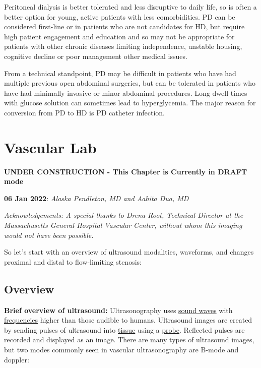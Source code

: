 \documentclass[
]{book}
\begin{document}
Peritoneal dialysis is better tolerated and less disruptive to daily
life, so is often a better option for young, active patients with less
comorbidities. PD can be considered first-line or in patients who are
not candidates for HD, but require high patient engagement and education
and so may not be appropriate for patients with other chronic diseases
limiting independence, unstable housing, cognitive decline or poor
management other medical issues.\citep{ansari2011}

From a technical standpoint, PD may be difficult in patients who have
had multiple previous open abdominal surgeries, but can be tolerated in
patients who have had minimally invasive or minor abdominal
procedures.\citep{sinnakirouchenan2011} Long dwell times with glucose
solution can sometimes lead to hyperglycemia. The major reason for
conversion from PD to HD is PD catheter infection.\citep{li2017}

\hypertarget{vascular-lab}{%
\chapter{Vascular Lab}\label{vascular-lab}}

\textbf{UNDER CONSTRUCTION - This Chapter is Currently in DRAFT mode}

\textbf{06 Jan 2022}: \emph{Alaska Pendleton, MD and Aahita Dua, MD}

\emph{Acknowledgements: A special thanks to Drena Root, Technical Director at
the Massachusetts General Hospital Vascular Center, without whom this
imaging would not have been possible.}

So let's start with an overview of ultrasound modalities, waveforms, and
changes proximal and distal to flow-limiting stenosis:

\hypertarget{overview}{%
\section{\texorpdfstring{\textbf{Overview}}{Overview}}\label{overview}}

\textbf{Brief overview of ultrasound:} Ultrasonography uses \href{https://en.wikipedia.org/wiki/Sound_wave}{sound
waves} with
\href{https://en.wikipedia.org/wiki/Frequency}{frequencies} higher than those
audible to humans. Ultrasound images are created by sending pulses of
ultrasound into \href{https://en.wikipedia.org/wiki/Tissue_(biology)}{tissue}
using a
\href{https://en.wikipedia.org/wiki/Ultrasound_transducer\#Use_in_medicine}{probe}.
Reflected pulses are recorded and displayed as an image. There are many
types of ultrasound images, but two modes commonly seen in vascular
ultrasonography are B-mode and doppler:
\end{document}
